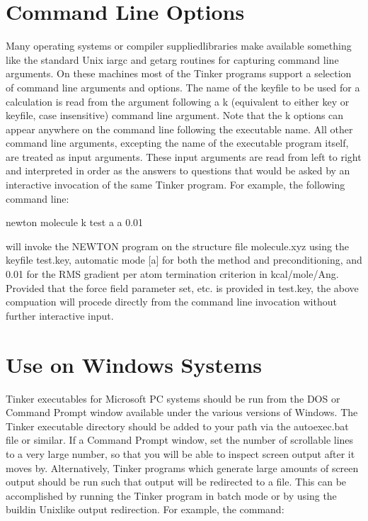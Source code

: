 \documentclass[letterpaper,11pt,english]{sphinxmanual}
\begin{document}
\section{Command Line Options}
\label{\detokenize{text/special-features:command-line-options}}
Many operating systems or compiler supplied\sphinxhyphen{}libraries make available something like the standard Unix iargc and getarg routines for capturing command line arguments. On these machines most of the Tinker programs support a selection of command line arguments and options. The name of the keyfile to be used for a calculation is read from the argument following a \sphinxhyphen{}k (equivalent to either \sphinxhyphen{}key or \sphinxhyphen{}keyfile, case insensitive) command line argument. Note that the \sphinxhyphen{}k options can appear anywhere on the command line following the executable name. All other command line arguments, excepting the name of the executable program itself, are treated as input arguments. These input arguments are read from left to right and interpreted in order as the answers to questions that would be asked by an interactive invocation of the same Tinker program. For example, the following command line:

newton molecule \sphinxhyphen{}k test a a 0.01

will invoke the NEWTON program on the structure file molecule.xyz using the keyfile test.key, automatic mode {[}a{]} for both the method and preconditioning, and 0.01 for the RMS gradient per atom termination criterion in kcal/mole/Ang. Provided that the force field parameter set, etc. is provided in test.key, the above compuation will procede directly from the command line invocation without further interactive input.


\section{Use on Windows Systems}
\label{\detokenize{text/special-features:use-on-windows-systems}}
Tinker executables for Microsoft PC systems should be run from the DOS or Command Prompt window available under the various versions of Windows. The Tinker executable directory should be added to your path via the autoexec.bat file or similar. If a Command Prompt window, set the number of scrollable lines to a very large number, so that you will be able to inspect screen output after it moves by. Alternatively, Tinker programs which generate large amounts of screen output should be run such that output will be redirected to a file. This can be accomplished by running the Tinker program in batch mode or by using the build\sphinxhyphen{}in Unix\sphinxhyphen{}like output redirection. For example, the command:
\end{document}
